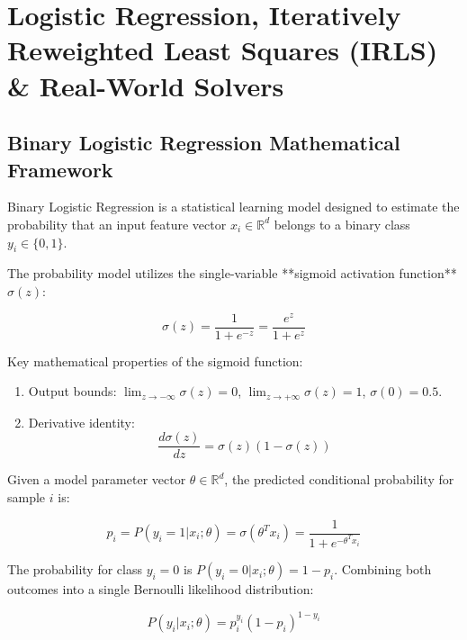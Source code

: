 \chapter{Logistic Regression, Iteratively Reweighted Least Squares (IRLS) \& Real-World Solvers}
\label{ch:irls_financial}

\section{Binary Logistic Regression Mathematical Framework}
Binary Logistic Regression is a statistical learning model designed to estimate the probability that an input feature vector $x_i \in \mathbb{R}^d$ belongs to a binary class $y_i \in \{0, 1\}$.

The probability model utilizes the single-variable **sigmoid activation function** $\sigma(z)$:

\begin{equation}
\sigma(z) = \frac{1}{1 + e^{-z}} = \frac{e^z}{1 + e^z}
\end{equation}

Key mathematical properties of the sigmoid function:
\begin{enumerate}[leftmargin=*]
    \item Output bounds: $\lim_{z \to -\infty} \sigma(z) = 0$, $\lim_{z \to +\infty} \sigma(z) = 1$, $\sigma(0) = 0.5$.
    \item Derivative identity:
    \begin{equation}
    \frac{d \sigma(z)}{d z} = \sigma(z) (1 - \sigma(z))
    \end{equation}
\end{enumerate}

Given a model parameter vector $\theta \in \mathbb{R}^d$, the predicted conditional probability for sample $i$ is:

\begin{equation}
p_i = P(y_i = 1 | x_i; \theta) = \sigma(\theta^T x_i) = \frac{1}{1 + e^{-\theta^T x_i}}
\end{equation}

The probability for class $y_i = 0$ is $P(y_i = 0 | x_i; \theta) = 1 - p_i$. Combining both outcomes into a single Bernoulli likelihood distribution:

\begin{equation}
P(y_i | x_i; \theta) = p_i^{y_i} (1 - p_i)^{1 - y_i}
\end{equation}

